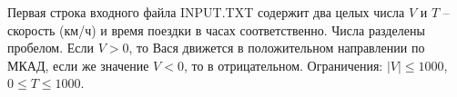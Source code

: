 Первая строка входного файла INPUT.TXT содержит два целых числа $V$ и $T$ -- скорость (км/ч) и время поездки в часах соответственно. Числа разделены пробелом. Если $V>0$, то Вася движется в положительном направлении по МКАД, если же значение $V<0$, то в отрицательном. Ограничения: $|V| \leq 1000$, $0 \leq T \leq 1000$.
